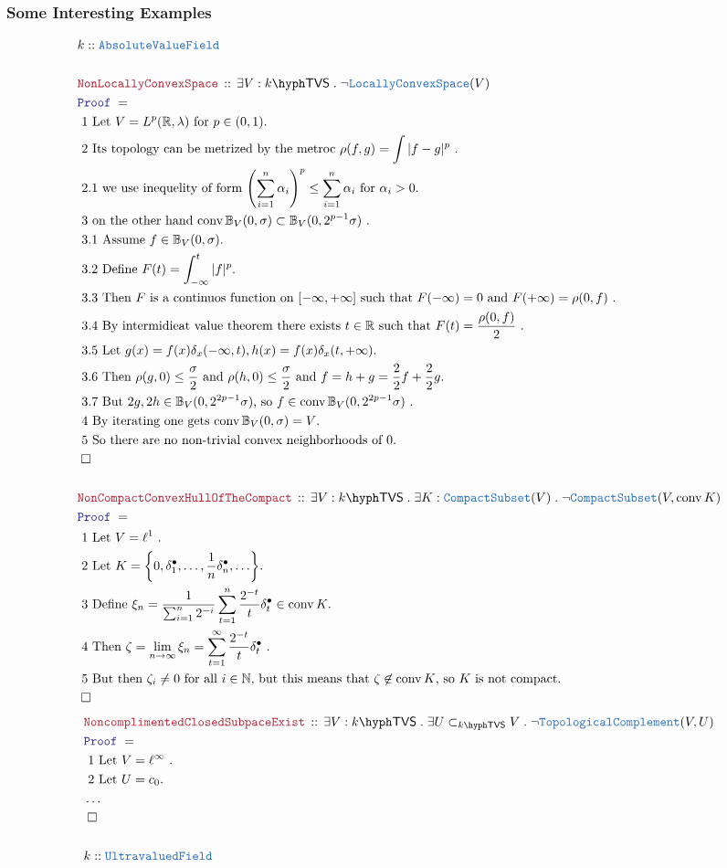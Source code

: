 \documentclass[12pt]{scrartcl}
\newcommand{\TYPE}[1]{\textcolor{NavyBlue}{\mathtt{#1}}}
\newcommand{\LOGIC}[1]{\textcolor{Blue}{\mathtt{#1}}}
\newcommand{\THM}[1]{\textcolor{Maroon}{\mathtt{#1}}}
\renewcommand{\.}{\; . \;}
\newcommand{\Theorem}[2]{& \THM{#1} \, :: \, #2 \\ & \Proof = \\ }
\newcommand{\Page}[1]{ \begin{align*} #1 \end{align*}   }
\newcommand{\NoProof}{ & \ldots \\ \EndProof}
\newcommand{\Explain}[1]{& \text{#1.} \\}
\newcommand{\Reals}{\mathbb{R} }
\newcommand{\Nat}{\mathbb{N} }
\newcommand{\QED}{\; \square}
\newcommand{\EndProof}{& \QED \\}
\newcommand{\Proof}{\LOGIC{Proof} \; }
\newcommand{\Compacts}{\TYPE{CompactSubset}}
\newcommand{\Cell}{\mathbb{B}}
\DeclareMathOperator{\conv}{conv}
\newcommand{\AVF}{\TYPE{AbsoluteValueField}}
\newcommand{\LConv}{\TYPE{LocallyConvexSpace}}
\newcommand{\TC}{\TYPE{TopologicalComplement}}
\newcommand{\TVS}[1]{{#1}\hyph\mathsf{TVS}}
\begin{document}
\subsubsection{Some Interesting Examples}
\Page{
	& k :: \AVF \\
	\\
	\Theorem{NonLocallyConvexSpace}{
		\exists V : \TVS{k} \.  
		\neg\LConv(V)
	}
	\Explain{ 1 Let $V = L^p(\Reals,\lambda)$ for $p \in (0,1)$}
	\Explain{ 2 Its topology can be metrized by the metroc $\rho(f,g) = \int |f- g|^p$  }
	\Explain{ 2.1 we use inequelity of form 
		$\left( \sum^n_{i=1} \alpha_i \right)^p \le \sum^n_{i=1} \alpha_i$
			for 	$\alpha_i > 0$}
	\Explain{ 3 on the other hand $\conv \Cell_V(0,\sigma) \subset \Cell_V(0,2^{p-1}\sigma)$ }
	\Explain{ 3.1 Assume $f \in \Cell_V(0,\sigma)$}
	\Explain{ 3.2 Define $F(t) = \int_{-\infty}^t |f|^p$}
	\Explain{ 3.3 Then $F$ is a continuos function on $[-\infty,+\infty]$ 
		such that $F(-\infty) = 0$ and $F(+\infty) = \rho(0,f)$ }
	\Explain{ 3.4 By intermidieat value theorem there exists $t \in \Reals$
		such that $F(t) = \frac{\rho(0,f)}{2}$
	}
	\Explain{ 3.5 Let $g(x) = f(x)\delta_x(-\infty,t), h(x) = f(x)\delta_x(t,+\infty)$}
	\Explain{ 3.6 Then  $\rho(g,0) \le \frac{\sigma}{2}$ and  $\rho(h,0) \le \frac{\sigma}{2}$
		and $f = h + g = \frac{2}{2}f + \frac{2}{2}g$}
	\Explain{ 3.7 But $2g,2h \in \Cell_V(0,2^{2p-1}\sigma)$, so $f \in \conv \Cell_V(0,2^{2p-1}\sigma)$ }
	\Explain{ 4 By iterating one gets $\conv \Cell_V(0,\sigma) = V$}
	\Explain{ 5 So there are no non-trivial convex neighborhoods of $0$}
	\EndProof
	\\
	\Theorem{NonCompactConvexHullOfTheCompact}
	{
		\exists V  : \TVS{k} \.
		\exists K : \Compacts(V) \.
		\neg \Compacts(V, \conv K)
	}
	\Explain{ 1 Let $V = \ell^1$ }
	\Explain{ 2 Let $K = \left\{0, \delta_1^\bullet,\ldots, \frac{1}{n} \delta_{n}^\bullet  ,\ldots \right\}$}
	\Explain{ 3 Define $\xi_n = 
		\frac{1}{\sum^n_{i=1} 2^{-i}  } \sum^n_{t=1} \frac{2^{-t}}{t} \delta_{t}^\bullet
			\in \conv K$}
	\Explain{ 4 Then $\zeta = 
		\lim_{n \to \infty} \xi_n =  \sum^\infty_{t=1} \frac{2^{-t}}{t} \delta_{t}^\bullet$
	}
	\Explain{ 5 But then $\zeta_i \neq 0$ for all $i \in \Nat$,
		but this means that $\zeta \not \in \conv K$, so $K$ is not compact}
	\EndProof
}\Page{
	\Theorem{NoncomplimentedClosedSubpaceExist}
	{
		\exists V : \TVS{k} \.
		\exists U \subset_{\TVS{k}} V \.
		\neg  \TC(V,U)
	}
	\Explain{ 1 Let $V = \ell^\infty$ }
	\Explain{ 2 Let $U = c_0$}
	\NoProof
	\\
	& k :: \TYPE{UltravaluedField} \\
}
\end{document}
